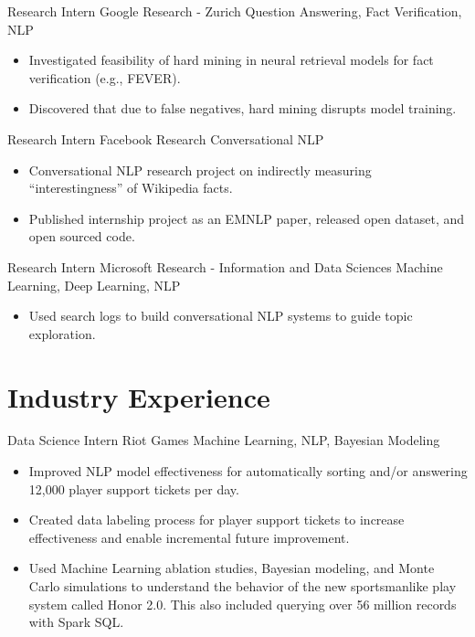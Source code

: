 \documentclass[11pt,a4paper,sans]{moderncv} %
\begin{document}
		{Research Intern}
		{Google Research - Zurich}
		{Question Answering, Fact Verification, NLP}
		{}
		{
			\begin{itemize}
				\item Investigated feasibility of hard mining in neural retrieval models for fact verification (e.g., FEVER).
				\item Discovered that due to false negatives, hard mining disrupts model training.
			\end{itemize}
		}

		{Research Intern}
		{Facebook Research}
		{Conversational NLP}
		{}
		{
			\begin{itemize}
				\item Conversational NLP research project on indirectly measuring ``interestingness'' of Wikipedia facts.
				\item Published internship project as an EMNLP paper, released open dataset, and open sourced code.
			\end{itemize}
		}

		{Research Intern}
		{Microsoft Research - Information and Data Sciences}
		{Machine Learning, Deep Learning, NLP}
		{}
		{
			\begin{itemize}
			\item Used search logs to build conversational NLP systems to guide topic exploration.
			\end{itemize}
		}

\section{Industry Experience}
		{Data Science Intern}
		{Riot Games}
		{Machine Learning, NLP, Bayesian Modeling}
		{}
		{
			\begin{itemize}
			\item Improved NLP model effectiveness for automatically sorting and/or answering 12,000 player support tickets per day.
			\item Created data labeling process for player support tickets to increase effectiveness and enable incremental future improvement.
			\item Used Machine Learning ablation studies, Bayesian modeling, and Monte Carlo simulations to understand the behavior of the new sportsmanlike play system called Honor 2.0. This also included querying over 56 million records with Spark SQL.
			\end{itemize}
		}
\end{document}
